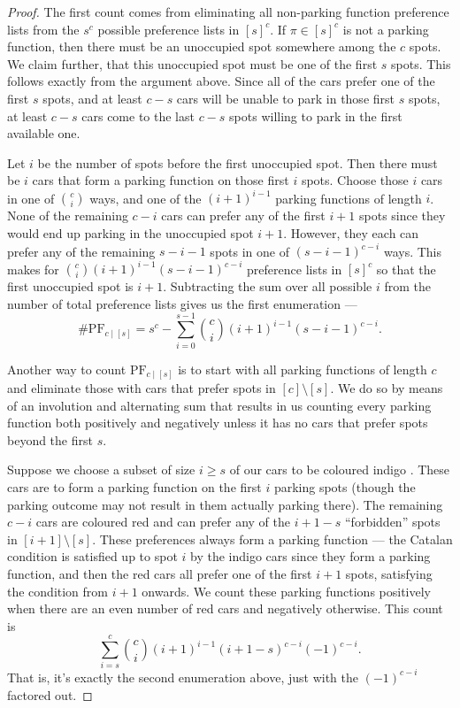 \documentclass[12 pt]{amsart}
\theoremstyle{definition} %
\theoremstyle{remark} %
\begin{document}
\resPFcount* {}

\begin{proof}
	The first count comes from eliminating all non-parking function preference lists from the $s^{c}$ possible preference lists in $[s]^{c}$. If $\pi \in [s]^{c}$ is not a parking function, then there must be an unoccupied spot somewhere among the $c$ spots. We claim further, that this unoccupied spot must be one of the first $s$ spots. This follows exactly from the argument above. Since all of the cars prefer one of the first $s$ spots, and at least $c - s$ cars will be unable to park in those first $s$ spots, at least $c - s$ cars come to the last $c - s$ spots willing to park in the first available one.

	Let $i$ be the number of spots before the first unoccupied spot. Then there must be $i$ cars that form a parking function on those first $i$ spots. Choose those $i$ cars in one of $\binom{c}{i}$ ways, and one of the $(i + 1)^{i - 1}$ parking functions of length $i$. None of the remaining $c - i$ cars can prefer any of the first $i + 1$ spots since they would end up parking in the unoccupied spot $i + 1$. However, they each can prefer any of the remaining $s - i - 1$ spots in one of $(s - i - 1)^{c - i}$ ways. This makes for $\binom{c}{i} (i + 1)^{i - 1}(s - i - 1)^{c - i}$ preference lists in $[s]^{c}$ so that the first unoccupied spot is $i + 1$. Subtracting the sum over all possible $i$ from the number of total preference lists gives us the first enumeration ---
	\[
		\# \mathrm{PF}_{c \mid [s]} = s^{c} - \sum_{i = 0}^{s - 1} \binom{c}{i} (i + 1)^{i - 1} (s - i - 1)^{c - i}.
	\]

	Another way to count $\mathrm{PF}_{c \mid [s]}$ is to start with all parking functions of length $c$ and eliminate those with cars that prefer spots in $[c] \setminus [s]$. We do so by means of an involution and alternating sum  that results in us counting every parking function both positively and negatively unless it has no cars that prefer spots beyond the first $s$.

	Suppose we choose a subset of size $i \ge s$ of our cars to be coloured indigo \todo[jayden]{}. These cars are to form a parking function on the first $i$ parking spots (though the parking outcome may not result in them actually parking there). The remaining $c - i$ cars are coloured red and can prefer any of the $i + 1 - s$ ``forbidden'' spots in  $[i + 1] \setminus [s]$. These preferences always form a parking function --- the Catalan condition is satisfied up to spot $i$ by the indigo cars since they form a parking function, and then the red cars all prefer one of the first $i + 1$ spots, satisfying the condition from $i+1$ onwards. We count these parking functions positively when there are an even number of red cars and negatively otherwise. This count is
	\[
		\sum_{i = s}^{c} \binom{c}{i} (i + 1)^{i - 1} (i + 1 - s)^{c - i} (-1)^{c - i}.
	\]
	That is, it's exactly the second enumeration above, just with the $(-1)^{c - i}$ factored out.


\end{proof}
\end{document}
